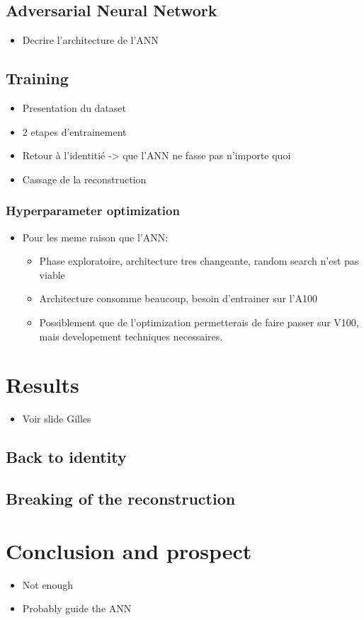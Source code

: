 \documentclass[../main.tex]{subfiles}
\begin{document}
\subsection{Adversarial Neural Network}
\label{sec:janne:arch:ann}
\begin{itemize}
  \item Decrire l'architecture de l'ANN
\end{itemize}

\subsection{Training}
\label{sec:janne:arch:training}
\begin{itemize}
  \item Presentation du dataset
  \item 2 etapes d'entrainement
  \item Retour à l'identitié -> que l'ANN ne fasse pas n'importe quoi
  \item Cassage de la reconstruction
\end{itemize}

\subsubsection{Hyperparameter optimization}
\label{sec:janne:arch:hyper}
\begin{itemize}
  \item Pour les meme raison que l'ANN:
    \begin{itemize}
      \item Phase exploratoire, architecture tres changeante, random search n'est pas viable
      \item Architecture consomme beaucoup, besoin d'entrainer sur l'A100
      \item Possiblement que de l'optimization permetterais de faire passer sur V100, mais developement techniques necessaires.
    \end{itemize}
\end{itemize}

\section{Results}
\label{sec:janne:results}

\begin{itemize}
  \item Voir slide Gilles
\end{itemize}

\subsection{Back to identity}
\label{sec:janne:results:identity}

\subsection{Breaking of the reconstruction}
\label{sec:janne:results:break}

\section{Conclusion and prospect}
\label{sec:janne:conclusion}
\begin{itemize}
  \item Not enough
  \item Probably guide the ANN
\end{itemize}
\end{document}
